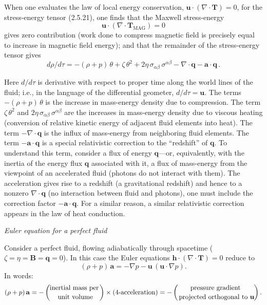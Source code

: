 \smallskip
\noindent
When one evaluates the law of local energy conservation,
$\mathbf{u}\cdot(\nabla\cdot\mathbf{T}) = 0$,
for the stress-energy tensor (2.5.21), one finds that the Maxwell
stress-energy
%
\begin{equation}
\tag{2.5.26}
\mathbf{u}\cdot(\nabla\cdot\mathbf{T}_{\text{MAG}}) = 0
\end{equation}
%
gives zero contribution (work done to compress magnetic field is
precisely equal to increase in magnetic field energy); and that the
remainder of the stress-energy tensor gives
%
\begin{equation}
\tag{2.5.27}
d\rho/d\tau = -(\rho + p)\,\theta
+ \zeta\,\theta^2 + 2\eta\,\sigma_{\alpha\beta}\,\sigma^{\alpha\beta}
- \nabla\cdot\mathbf{q} - \mathbf{a}\cdot\mathbf{q}\,.
\end{equation}

\noindent
Here $d/d\tau$ is derivative with respect to proper time along the
world lines of the fluid; i.e., in the language of the differential
geometer, $d/d\tau = \mathbf{u}$.  The terms $-(\rho + p)\,\theta$ is
the increase in mass-energy density due to compression.  The term
$\zeta\,\theta^2$ and $2\eta\,\sigma_{\alpha\beta}\,\sigma^{\alpha\beta}$
are the increases in mass-energy density due to viscous heating
(conversion of relative kinetic energy of adjacent fluid elements into
heat).  The term $-\nabla\cdot\mathbf{q}$ is the influx of
mass-energy from neighboring fluid elements.  The term
$-\mathbf{a}\cdot\mathbf{q}$ is a special relativistic correction to
the ``redshift'' of $\mathbf{q}$.  To understand this term, consider a
flux of energy $\mathbf{q}$---or, equivalently, with the inertia of
the energy flux $\mathbf{q}$ associated with it, a flux of mass-energy
from the viewpoint of an accelerated fluid (photons do not interact with
them).  The acceleration gives rise to a redshift (a gravitational
redshift) and hence to a nonzero $\nabla\cdot\mathbf{q}$ (no
interaction between fluid and photons), one must include the correction
factor $-\mathbf{a}\cdot\mathbf{q}$.  For a similar reason, a similar
relativistic correction appears in the law of heat conduction.

\bigskip
\noindent
\emph{Euler equation for a perfect fluid}

\smallskip
\noindent
Consider a perfect fluid, flowing adiabatically through spacetime
($\zeta = \eta = \mathbf{B} = \mathbf{q} = 0$).  In this case the
Euler equations $\mathbf{h}\cdot(\nabla\cdot\mathbf{T}) = 0$ reduce to
%
\begin{equation}
\tag{2.5.30}
(\rho + p)\,\mathbf{a} = -\nabla p - \mathbf{u}\,(\mathbf{u}\cdot\nabla p).
\end{equation}
%
In words:
\[
(\rho + p)\,\mathbf{a}
= -\left(\!\text{inertial mass per}\atop\text{unit volume}\!\right)
  \times\text{(4-acceleration)}
= -\left(\!\text{pressure gradient}\atop\text{projected orthogonal to }\mathbf{u}\!\right).
\]
